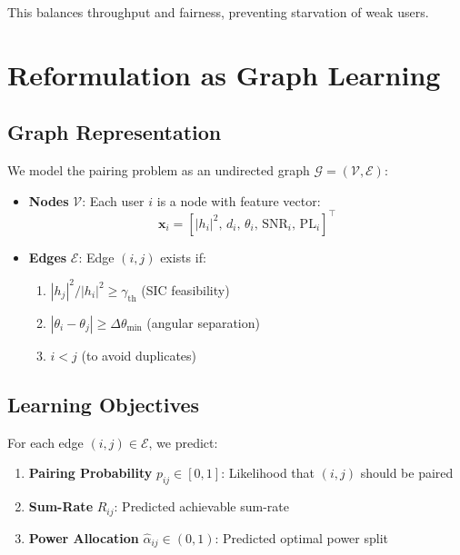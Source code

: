 This balances throughput and fairness, preventing starvation of weak users.

\section{Reformulation as Graph Learning}

\subsection{Graph Representation}

We model the pairing problem as an undirected graph $\mathcal{G} = (\mathcal{V}, \mathcal{E})$:

\begin{itemize}
    \item \textbf{Nodes} $\mathcal{V}$: Each user $i$ is a node with feature vector:
    \begin{equation}
    \mathbf{x}_i = [|h_i|^2, \, d_i, \, \theta_i, \, \text{SNR}_i, \, \text{PL}_i]^\top
    \end{equation}
    
    \item \textbf{Edges} $\mathcal{E}$: Edge $(i, j)$ exists if:
    \begin{enumerate}
        \item $|h_j|^2 / |h_i|^2 \geq \gamma_{\text{th}}$ (SIC feasibility)
        \item $|\theta_i - \theta_j| \geq \Delta\theta_{\min}$ (angular separation)
        \item $i < j$ (to avoid duplicates)
    \end{enumerate}
\end{itemize}

\subsection{Learning Objectives}

For each edge $(i, j) \in \mathcal{E}$, we predict:

\begin{enumerate}
    \item \textbf{Pairing Probability} $p_{ij} \in [0, 1]$: Likelihood that $(i, j)$ should be paired
    
    \item \textbf{Sum-Rate} $\hat{R}_{ij}$: Predicted achievable sum-rate
    
    \item \textbf{Power Allocation} $\hat{\alpha}_{ij} \in (0, 1)$: Predicted optimal power split
\end{enumerate}

